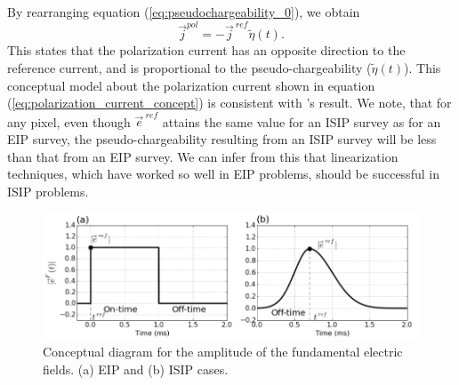 \documentclass[a4paper, 11pt]{article}
\renewcommand {\j}  { {\vec j} }
\newcommand {\e}  { {\vec e} }
\newcommand{\peta}{\tilde{\eta}}
\newcommand{\eref}{\e^{\ ref}}
\newcommand{\jref}{\j^{\ ref}}
\begin{document}
By rearranging equation (\ref{eq:pseudochargeability_0}), we obtain 
\begin{equation}
  \j^{pol} = -\jref\peta(t). 
  \label{eq:polarization_current_concept}
\end{equation}
This states that the polarization current has an opposite direction to the reference current, and is proportional to the pseudo-chargeability ($\peta(t)$). 
This conceptual model about the polarization current shown in equation (\ref{eq:polarization_current_concept}) is consistent with \cite{seigel1959}'s result. We note, that for any pixel, even though  $\eref$  attains the same value for an ISIP survey as for an EIP survey, the pseudo-chargeability resulting from  an ISIP survey  will be less than that from an EIP survey. We can infer from this that  linearization techniques, which  have worked so well in EIP problems, should be successful in ISIP problems. 

\begin{figure}
  \centering  
  \includegraphics[width=1.0\textwidth]{figures/DCEM_F_current.png}
  \caption{Conceptual diagram for the amplitude of the fundamental electric fields. (a) EIP and (b) ISIP cases.}
  \label{F:DCEM_F_current}
\end{figure}   

\end{document}
